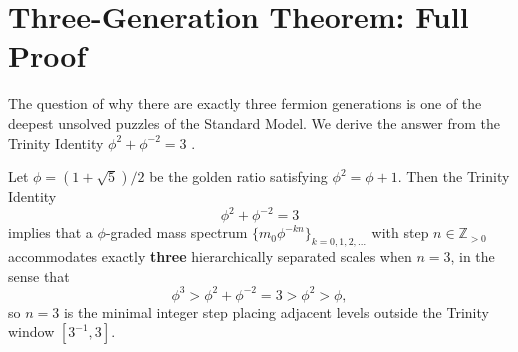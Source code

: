 \section{Three-Generation Theorem: Full Proof}
\label{sec:scarab-three-gen}

The question of why there are exactly three fermion generations is one
of the deepest unsolved puzzles of the Standard Model.
We derive the answer from the Trinity Identity $\phi^2+\phi^{-2}=3$
\cite{trios_throne}.

\begin{theorem}
\label{thm:scarab-three-gen}
Let $\phi=(1+\sqrt{5})/2$ be the golden ratio satisfying
$\phi^2 = \phi + 1$.  Then the Trinity Identity
\begin{equation}
  \phi^2 + \phi^{-2} = 3
\end{equation}
implies that a $\phi$-graded mass spectrum $\{m_0\phi^{-kn}\}_{k=0,1,2,\ldots}$
with step $n\in\mathbb{Z}_{>0}$ accommodates exactly \textbf{three}
hierarchically separated scales when $n=3$, in the sense that
\begin{equation}
  \phi^3 > \phi^2 + \phi^{-2} = 3 > \phi^2 > \phi,
\end{equation}
so $n=3$ is the minimal integer step placing adjacent levels outside
the Trinity window $[3^{-1}, 3]$.
\end{theorem}

